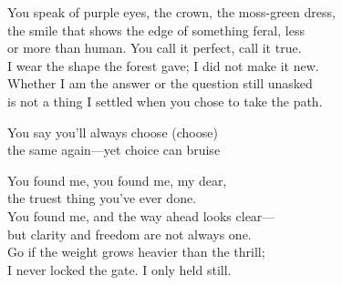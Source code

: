 \begin{lyrics}
You speak of purple eyes, the crown, the moss-green dress,\\
the smile that shows the edge of something feral, less\\
or more than human. You call it perfect, call it true.\\
I wear the shape the forest gave; I did not make it new.\\
Whether I am the answer or the question still unasked\\
is not a thing I settled when you chose to take the path.

You say you’ll always choose (choose)\\
the same again—yet choice can bruise

You found me, you found me, my dear,\\
the truest thing you’ve ever done.\\
You found me, and the way ahead looks clear—\\
but clarity and freedom are not always one.\\
Go if the weight grows heavier than the thrill;\\
I never locked the gate. I only held still.
\end{lyrics}

